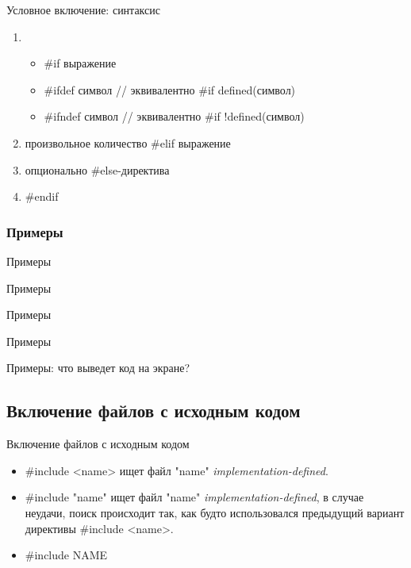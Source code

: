     \begin{frame}{Условное включение: синтаксис}
        \begin{enumerate}
            \item
                \begin{itemize}
                    \item \#if выражение
                    \item \#ifdef символ // эквивалентно \#if defined(символ)
                    \item \#ifndef символ // эквивалентно \#if !defined(символ)
                \end{itemize}
            \item произвольное количество \#elif выражение
            \item опционально \#else-директива
            \item \#endif
        \end{enumerate}
    \end{frame}
    \subsubsection{Примеры}
    \begin{frame}{Примеры}
        
    \end{frame}
    \begin{frame}{Примеры}
        
    \end{frame}
    \begin{frame}{Примеры}
        
    \end{frame}
    \begin{frame}{Примеры}
        
    \end{frame}
    \begin{frame}{Примеры: что выведет код на экране?}
        
    \end{frame}
    \subsection{Включение файлов с исходным кодом}
    \begin{frame}{Включение файлов с исходным кодом}
        \begin{itemize}
            \item \#include <name> ищет файл "name" \textit{implementation-defined}.
            \item \#include "name" ищет файл "name" \textit{implementation-defined}, в случае неудачи,
                поиск происходит так, как будто использовался предыдущий вариант директивы \#include <name>.
            \item \#include NAME
        \end{itemize}
    \end{frame}
